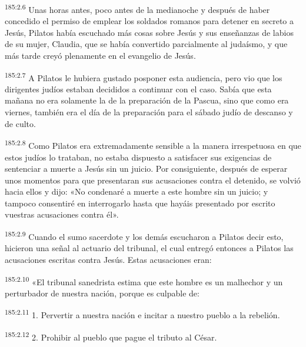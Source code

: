 \par 
\textsuperscript{185:2.6} Unas horas antes, poco antes de la medianoche y después de haber concedido el permiso de emplear los soldados romanos para detener en secreto a Jesús, Pilatos había escuchado más cosas sobre Jesús y sus enseñanzas de labios de su mujer, Claudia, que se había convertido parcialmente al judaísmo, y que más tarde creyó plenamente en el evangelio de Jesús.

\par 
\textsuperscript{185:2.7} A Pilatos le hubiera gustado posponer esta audiencia, pero vio que los dirigentes judíos estaban decididos a continuar con el caso. Sabía que esta mañana no era solamente la de la preparación de la Pascua, sino que como era viernes, también era el día de la preparación para el sábado judío de descanso y de culto.

\par 
\textsuperscript{185:2.8} Como Pilatos era extremadamente sensible a la manera irrespetuosa en que estos judíos lo trataban, no estaba dispuesto a satisfacer sus exigencias de sentenciar a muerte a Jesús sin un juicio. Por consiguiente, después de esperar unos momentos para que presentaran sus acusaciones contra el detenido, se volvió hacia ellos y dijo: «No condenaré a muerte a este hombre sin un juicio; y tampoco consentiré en interrogarlo hasta que hayáis presentado por escrito vuestras acusaciones contra él».

\par 
\textsuperscript{185:2.9} Cuando el sumo sacerdote y los demás escucharon a Pilatos decir esto, hicieron una señal al actuario del tribunal, el cual entregó entonces a Pilatos las acusaciones escritas contra Jesús. Estas acusaciones eran:

\par 
\textsuperscript{185:2.10} «El tribunal sanedrista estima que este hombre es un malhechor y un perturbador de nuestra nación, porque es culpable de:

\par 
\textsuperscript{185:2.11} 1. Pervertir a nuestra nación e incitar a nuestro pueblo a la rebelión.

\par 
\textsuperscript{185:2.12} 2. Prohibir al pueblo que pague el tributo al César.

